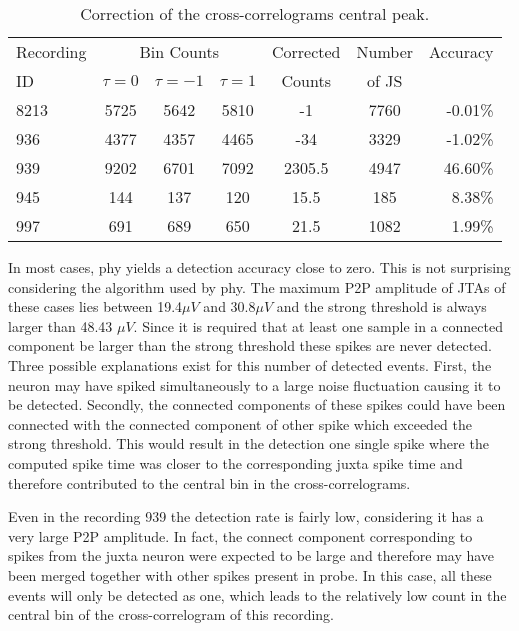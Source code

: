 \begin{table}[!h]
\begin{center}
\begin{tabular}{p{1.5cm}cccccr} %

\multicolumn{ 1}{p{1.5cm}}{Recording } & \multicolumn{ 3}{c}{Bin Counts} &  \multicolumn{ 1}{p{1.3cm}}{Corrected} & \multicolumn{ 1}{c}{Number} & \multicolumn{ 1}{c}{Accuracy} \\ 
\multicolumn{ 1}{l}{ID} & $\tau=0$ & $\tau=-1$ & $\tau=1$ & \multicolumn{ 1}{c}{Counts} & \multicolumn{ 1}{p{1.3cm}}{of JS} & \multicolumn{ 1}{l}{} \\ \hline
8213 & 5725 & 5642 & 5810 & -1 & 7760 & -0.01\% \\
936 & 4377 & 4357 & 4465 & -34 & 3329 & -1.02\% \\
939 & 9202 & 6701 & 7092 & 2305.5 & 4947 & 46.60\% \\
945 & 144 & 137 & 120 & 15.5 & 185 & 8.38\% \\ 
997 & 691 & 689 & 650 & 21.5 & 1082 & 1.99\% \\ 
\end{tabular}
\end{center}
\caption{Correction of the cross-correlograms central peak.}
\label{tab:CCcorrection}
\end{table}


In most cases, phy yields a detection accuracy close to zero. This is not surprising considering the algorithm used by phy. The maximum P2P amplitude of JTAs of these cases lies between 19.4$\mu V$ and 30.8$\mu V$ and the strong threshold is always larger than 48.43 $\mu V$. Since it is required that at least one sample in a connected component be larger than the strong threshold these spikes are never detected. Three possible explanations exist for this number of detected events. First, the neuron may have spiked simultaneously to a large noise fluctuation causing it to be detected. Secondly, the connected components of these spikes could have been connected with the connected component of other spike which exceeded the strong threshold. This would result in the detection one single spike where the computed spike time was closer to the corresponding juxta spike time and therefore contributed to the central bin in the cross-correlograms.

Even in the recording 939 the detection rate is fairly low, considering it has a very large P2P amplitude. In fact, the connect component corresponding to spikes from the juxta neuron were expected to be large and therefore may have been merged together with other spikes present in probe. In this case, all these events will only be detected as one, which leads to the relatively low count in the central bin of the cross-correlogram of this recording.

